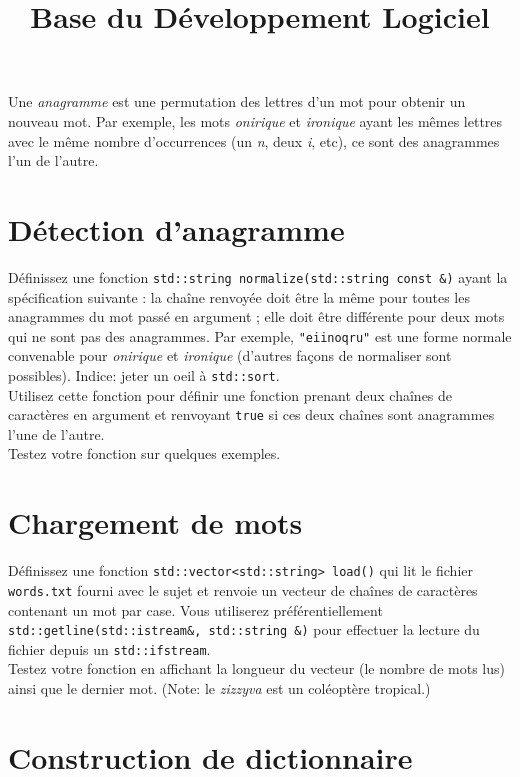 \documentclass[a4paper]{article}
\title{\vspace{-2cm}Base du Développement Logiciel}
\begin{document}
\maketitle

Une \emph{anagramme} est une permutation des lettres d'un mot pour
obtenir un nouveau mot. Par exemple, les mots \emph{onirique} et
\emph{ironique} ayant les mêmes lettres avec le même nombre d'occurrences
(un \emph{n}, deux \emph{i}, etc), ce sont des anagrammes l'un de
l'autre.

\section{Détection d'anagramme}

Définissez une fonction \lstinline|std::string normalize(std::string const &)|
ayant la spécification suivante : la chaîne renvoyée doit être la même
pour toutes les anagrammes du mot passé en argument ; elle doit être
différente pour deux mots qui ne sont pas des anagrammes.
Par exemple, \lstinline|"eiinoqru"| est une forme normale convenable pour
\emph{onirique} et \emph{ironique} (d'autres façons de normaliser sont
possibles). Indice: jeter un oeil à \texttt{std::sort}.\\

Utilisez cette fonction pour définir une fonction prenant deux chaînes de
caractères en argument et renvoyant \lstinline|true| si ces deux chaînes
sont anagrammes l'une de l'autre.\\

Testez votre fonction sur quelques exemples.

\section{Chargement de mots}

Définissez une fonction \lstinline|std::vector<std::string> load()| qui
lit le fichier \texttt{words.txt} fourni avec le sujet et renvoie un vecteur de chaînes de caractères contenant
un mot par case. Vous utiliserez préférentiellement \texttt{std::getline(std::istream\&, std::string \&)}
pour effectuer la lecture du fichier depuis un \texttt{std::ifstream}.\\

Testez votre fonction en affichant la longueur du vecteur (le nombre de
mots lus) ainsi que le dernier mot. (Note: le \emph{zizzyva} est un
coléoptère tropical.)

\section{Construction de dictionnaire}
\end{document}
